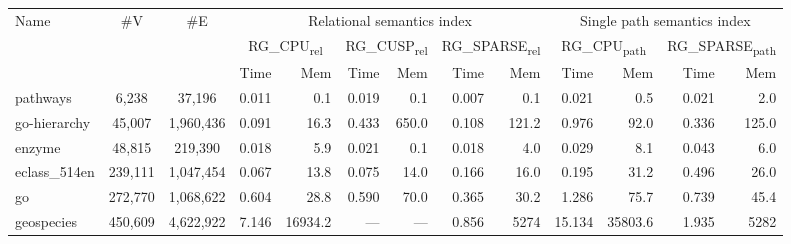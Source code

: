\documentclass[a0paper,portrait]{baposter}
\begin{document}
\begin{poster}
{\begin{center}
\begin{tabular}{| l | c | c | r  r | r  r | r  r | r  r | r  r |}
	\multirow{3}{*}{Name} & \multirow{3}{*}{\#V} & \multirow{3}{*}{\#E}  &   \multicolumn{6}{|c|}{Relational semantics index}	&	\multicolumn{4}{|c|}{Single path semantics index} \\
	\cline{4-13} & &
	&	\multicolumn{2}{|c|}{RG\_CPU\textsubscript{rel}}	&	\multicolumn{2}{|c|}{RG\_CUSP\textsubscript{rel}}	&	\multicolumn{2}{|c|}{RG\_SPARSE\textsubscript{rel}} &	\multicolumn{2}{|c|}{RG\_CPU\textsubscript{path}}	&	\multicolumn{2}{|c|}{RG\_SPARSE\textsubscript{path}}	 \\
	\cline{4-13} & &
	&   Time & Mem &  Time     & Mem & Time     & Mem  &  Time     & Mem & Time     & Mem \\
	\hline
	\hline
	pathways         & 6,238		& 37,196           & 0.011 & 0.1  & 0.019 & 0.1 & 0.007 & 0.1      & 0.021 & 0.5  & 0.021 & 2.0    \\
	go-hierarchy      & 45,007		& 1,960,436          & 0.091 & 16.3 & 0.433 & 650.0 & 0.108 & 121.2    & 0.976 & 92.0   & 0.336 & 125.0  \\
	enzyme         & 48,815		& 219,390             & 0.018 & 5.9  & 0.021 & 0.1 & 0.018 & 4.0        & 0.029 & 8.1  & 0.043 & 6.0    \\
	eclass\_514en       & 239,111		& 1,047,454          & 0.067 & 13.8 & 0.075 & 14.0  & 0.166 & 16.0     & 0.195 & 31.2 & 0.496 & 26.0   \\
	
	
	go           & 272,770		& 1,068,622                & 0.604 & 28.8 & 0.590  & 70.0  & 0.365 & 30.2     & 1.286 & 75.7 & 0.739 & 45.4 \\
		
	geospecies & 450,609	& 4,622,922  & 7.146 & 16934.2 & --- & --- & 0.856 & 5274 & 15.134 & 35803.6 & 1.935 & 5282   \\
	\hline
\end{tabular}
\end{center}

}
\end{poster}
\end{document}
